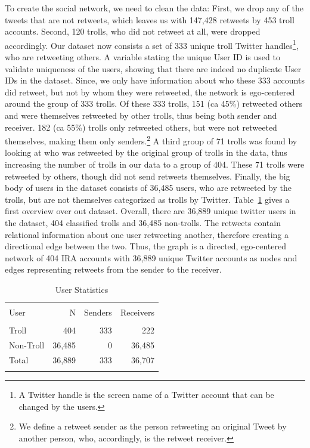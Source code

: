 \documentclass[12pt, titlepage=true, toc=bib]{scrartcl}
\begin{document}
To create the social network, we need to clean the data: First, we drop any of the tweets that are not retweets, which leaves us with 147,428 retweets by 453 troll accounts. Second, 120 trolls, who did not retweet at all, were dropped accordingly. Our dataset now consists a set of 333 unique troll Twitter handles\footnote{A Twitter handle is the screen name of a Twitter account that can be changed by the users.}, who are retweeting others. A variable stating the unique User ID is used to validate uniqueness of the users, showing that there are indeed no duplicate User IDs in the dataset. Since, we only have information about who these 333 accounts did retweet, but not by whom they were retweeted, the network is ego-centered around the group of 333 trolls. Of these 333 trolls, 151 (ca 45\%) retweeted others and were themselves retweeted by other trolls, thus being both sender and receiver. 182 (ca 55\%) trolls only retweeted others, but were not retweeted themselves, making them only senders.\footnote{We define a retweet sender as the person retweeting an original Tweet by another person, who, accordingly, is the retweet receiver.} A third group of 71 trolls was found by looking at who was retweeted by the original group of trolls in the data, thus increasing the number of trolls in our data to a group of 404. These 71 trolls were retweeted by others, though did not send retweets themselves. Finally, the big body of users in the dataset consists of 36,485 users, who are retweeted by the trolls, but are not themselves categorized as trolls by Twitter. Table~\ref{tab:userstat} gives a first overview over out dataset. Overall, there are 36,889 unique twitter users in the dataset, 404 classified trolls and 36,485 non-trolls. The retweets contain relational information about one user retweeting another, therefore creating a directional edge between the two. Thus, the graph is a directed, ego-centered network of 404 IRA accounts with 36,889 unique Twitter accounts as nodes and edges representing retweets from the sender to the receiver.

\begin{table}[ht] \centering 
\begin{tabular*}{.95\linewidth}{@{\extracolsep{\fill}} lrrr} 
\\[-1.8ex]\hline 
\hline \\[-1.8ex] 
User & N & Senders & Receivers \\ 
\hline \\[-1.8ex] 
Troll & 404 & 333 & 222 \\ 
Non-Troll & 36,485 & 0 & 36,485 \\ 
Total & 36,889 & 333 & 36,707 \\ 
\hline \\[-1.8ex] 
\end{tabular*} 
  \caption{User Statistics}
  \label{tab:userstat} 
\end{table} 
\end{document}
